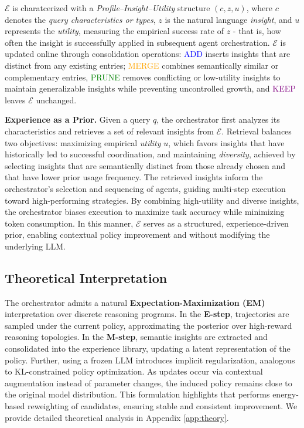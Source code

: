 $\mathcal{E}$ is charatcerized with a \textit{Profile–Insight–Utility} structure $(c, z, u)$, where $c$ denotes the \textit{query characteristics or types}, $z$ is the natural language \textit{insight}, and $u$ represents the \textit{utility}, measuring the empirical success rate of $z$ - that is, how often the insight is successfully applied in subsequent agent orchestration. $\mathcal{E}$ is updated online through consolidation operations: \textcolor{blue}{ADD} inserts insights that are distinct from any existing entries; \textcolor{orange}{MERGE} combines semantically similar or complementary entries, 
\textcolor{green}{PRUNE} removes conflicting or low-utility insights to maintain generalizable insights while preventing uncontrolled growth, and 
\textcolor{purple}{KEEP} leaves $\mathcal{E}$ unchanged. 

\textbf{Experience as a Prior.} Given a query $q$, the orchestrator first analyzes its characteristics and retrieves a set of relevant insights from $\mathcal{E}$. Retrieval balances two objectives: maximizing empirical \textit{utility} $u$, which favors insights that have historically led to successful coordination, and maintaining \textit{diversity}, achieved by selecting insights that are semantically distinct from those already chosen and that have lower prior usage frequency. The retrieved insights inform the orchestrator’s selection and sequencing of agents, guiding multi-step execution toward high-performing strategies. By combining high-utility and diverse insights, the orchestrator biases execution to maximize task accuracy while minimizing token consumption. In this manner, $\mathcal{E}$ serves as a structured, experience-driven prior, enabling contextual policy improvement and without modifying the underlying LLM. 



\vspace{-6pt}
\subsection{Theoretical Interpretation}
\vspace{-6pt}
The \hero orchestrator admits a natural \textbf{Expectation-Maximization (EM)} interpretation over discrete reasoning programs. In the \textbf{E-step}, trajectories are sampled under the current policy, approximating the posterior over high-reward reasoning topologies. In the \textbf{M-step}, semantic insights are extracted and consolidated into the experience library, updating a latent representation of the policy. Further, using a frozen LLM introduces implicit regularization, analogous to KL-constrained policy optimization. As updates occur via contextual augmentation instead of parameter changes, the induced policy remains close to the original model distribution. This formulation highlights that \hero performs energy-based reweighting of candidates, ensuring stable and consistent improvement. We provide detailed theoretical analysis in Appendix \ref{app:theory}.

